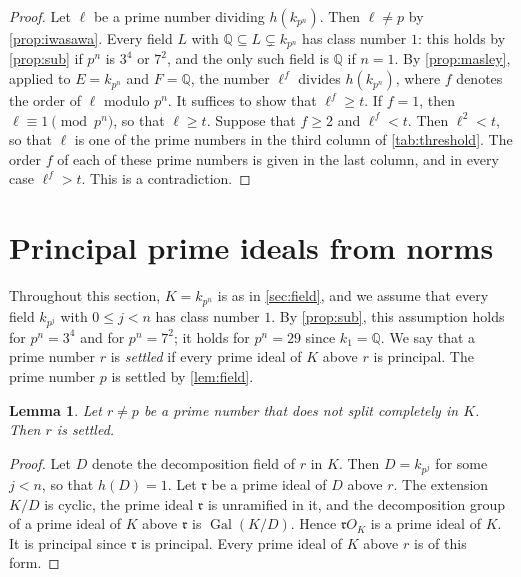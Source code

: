 \documentclass[11pt]{amsart}
\theoremstyle{plain}
\newtheorem{lemma}[theorem]{Lemma}
\theoremstyle{definition}
\begin{document}
\begin{proof}
Let $\ell$ be a prime number dividing $h(k_{p^n})$.
Then $\ell \ne p$ by \cref{prop:iwasawa}.
Every field $L$ with $\mathbb{Q} \subseteq L \subsetneq k_{p^n}$ has class number $1$: this holds by \cref{prop:sub} if $p^n$ is $3^4$ or $7^2$, and the only such field is $\mathbb{Q}$ if $n = 1$.
By \cref{prop:masley}, applied to $E = k_{p^n}$ and $F = \mathbb{Q}$, the number $\ell^f$ divides $h(k_{p^n})$, where $f$ denotes the order of $\ell$ modulo $p^n$.
It suffices to show that $\ell^f \ge t$.
If $f = 1$, then $\ell \equiv 1 \pmod{p^n}$, so that $\ell \ge t$.
Suppose that $f \ge 2$ and $\ell^f < t$.
Then $\ell^2 < t$, so that $\ell$ is one of the prime numbers in the third column of \cref{tab:threshold}.
The order $f$ of each of these prime numbers is given in the last column, and in every case $\ell^f > t$.
This is a contradiction.
\end{proof}

\section{Principal prime ideals from norms} \label{sec:relations}

Throughout this section, $K = k_{p^n}$ is as in \cref{sec:field}, and we assume that every field $k_{p^j}$ with $0 \le j < n$ has class number $1$.
By \cref{prop:sub}, this assumption holds for $p^n = 3^4$ and for $p^n = 7^2$; it holds for $p^n = 29$ since $k_1 = \mathbb{Q}$.
We say that a prime number $r$ is \emph{settled} if every prime ideal of $K$ above $r$ is principal.
The prime number $p$ is settled by \cref{lem:field}.

\begin{lemma} \label{lem:nonsplit}
Let $r \ne p$ be a prime number that does not split completely in $K$. Then $r$ is settled.
\end{lemma}

\begin{proof}
Let $D$ denote the decomposition field of $r$ in $K$.
Then $D = k_{p^j}$ for some $j < n$, so that $h(D) = 1$.
Let $\mathfrak{r}$ be a prime ideal of $D$ above $r$.
The extension $K/D$ is cyclic, the prime ideal $\mathfrak{r}$ is unramified in it, and the decomposition group of a prime ideal of $K$ above $\mathfrak{r}$ is $\operatorname{Gal}(K/D)$.
Hence $\mathfrak{r} O_K$ is a prime ideal of $K$.
It is principal since $\mathfrak{r}$ is principal.
Every prime ideal of $K$ above $r$ is of this form.
\end{proof}
\end{document}
